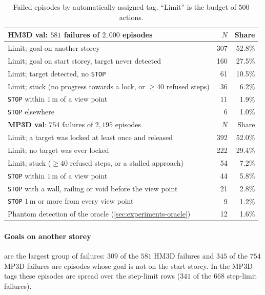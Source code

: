 \documentclass[10pt]{article}
\newcommand{\code}[1]{\texttt{#1}}
\newcommand{\m}{\,\mathrm{m}}
\begin{document}
\begin{table}[t]
\centering
\caption{Failed episodes by automatically assigned tag. ``Limit'' is the
budget of $500$ actions.}
\label{tab:failures}
\small
\begin{tabular}{@{}lrr@{}}
\toprule
\textbf{HM3D val}: $581$ failures of $2{,}000$ episodes & $N$ & Share \\
\midrule
Limit; goal on another storey                              & 307 & 52.8\% \\
Limit; goal on start storey, target never detected          & 160 & 27.5\% \\
Limit; target detected, no \code{STOP}                      & 61  & 10.5\% \\
Limit; stuck (no progress towards a lock, or $\ge40$ refused steps) & 36 & 6.2\% \\
\code{STOP} within $1\m$ of a view point                    & 11  & 1.9\% \\
\code{STOP} elsewhere                                       & 6   & 1.0\% \\
\midrule
\textbf{MP3D val}: $754$ failures of $2{,}195$ episodes & $N$ & Share \\
\midrule
Limit; a target was locked at least once and released       & 392 & 52.0\% \\
Limit; no target was ever locked                            & 222 & 29.4\% \\
Limit; stuck ($\ge40$ refused steps, or a stalled approach) & 54  & 7.2\% \\
\code{STOP} within $1\m$ of a view point                    & 44  & 5.8\% \\
\code{STOP} with a wall, railing or void before the view point & 21 & 2.8\% \\
\code{STOP} $1\m$ or more from every view point             & 9   & 1.2\% \\
Phantom detection of the oracle (\cref{sec:experiments-oracle}) & 12 & 1.6\% \\
\bottomrule
\end{tabular}
\end{table}

\paragraph{Goals on another storey} are the largest group of failures: $309$
of the $581$ HM3D failures and $345$ of the $754$ MP3D failures are episodes
whose goal is not on the start storey. In the MP3D tags these episodes are
spread over the step-limit rows ($341$ of the $668$ step-limit failures).
\end{document}
